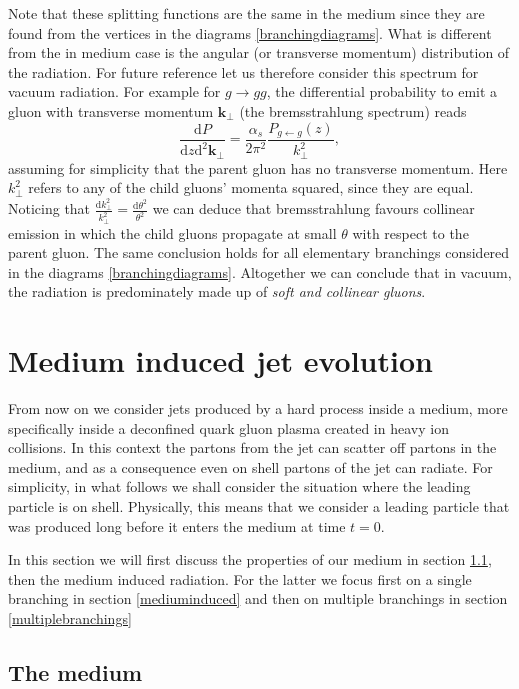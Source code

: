 \documentclass[a4paper,12pt]{article}
\numberwithin{equation}{section}
\begin{document}
Note that these splitting functions are the same in the medium since they are found from the vertices in the diagrams \eqref{branchingdiagrams}. What is different from the in medium case is the angular (or transverse momentum) distribution of the radiation. For future reference let us therefore consider this spectrum for vacuum radiation. For example for $g\rightarrow gg$, the differential probability to emit a gluon with transverse momentum $\mathbf{k}_\perp$ (the bremsstrahlung spectrum) reads
\begin{equation}
\frac{\mathrm{d}P}{\mathrm{d}z\mathrm{d}^2\mathbf{k}_\perp} =\frac{{\alpha_s}}{2\pi^2}\frac{P_{g\leftarrow g}(z)}{k_\perp^2},
\end{equation}
assuming for simplicity that the parent gluon has no transverse momentum. Here $k_\perp^2$ refers to any of the child gluons' momenta squared, since they are equal. Noticing that $\frac{\mathrm{d}k_\perp^2}{k_\perp^2} = \frac{\mathrm{d}\theta^2}{\theta^2}$ we can deduce that bremsstrahlung favours collinear emission in which the child gluons propagate at small $\theta$ with respect to the parent gluon. The same conclusion holds for all elementary branchings considered in the diagrams \eqref{branchingdiagrams}. Altogether we can conclude that in vacuum, the radiation is predominately made up of \emph{soft and collinear gluons}.


\section{Medium induced jet evolution}\label{medium}
From now on we consider jets produced by a hard process inside a medium, more specifically inside a deconfined quark gluon plasma created in heavy ion collisions. In this context the partons from the jet can scatter off partons in the medium, and as a consequence even on shell partons of the jet can radiate. For simplicity, in what follows we shall consider the situation where the leading particle is on shell. Physically, this means that we consider a leading particle that was produced long before it enters the medium at time $t=0$. 

In this section we will first discuss the properties of our medium in section \ref{themedium}, then the medium induced radiation. For the latter we focus first on a single branching in section \ref{mediuminduced} and then on multiple branchings in section \ref{multiplebranchings}

\subsection{The medium}\label{themedium}
\end{document}
